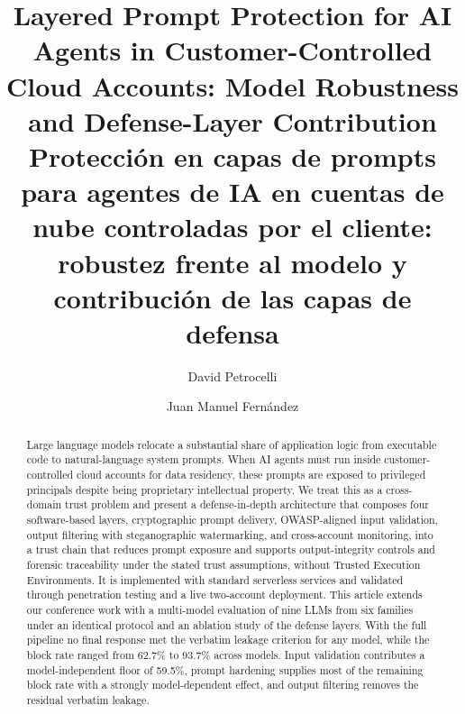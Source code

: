 \documentclass{jcst}
\title{Layered Prompt Protection for AI Agents in Customer-Controlled Cloud Accounts: Model Robustness and Defense-Layer Contribution \\
\large Protecci\'on en capas de prompts para agentes de IA en cuentas de nube controladas por el cliente: robustez frente al modelo y contribuci\'on de las capas de defensa}
\author[1\orcid{0009-0000-7331-3751}]{David Petrocelli}
\author[1,2\orcid{0000-0001-9291-3066}]{Juan Manuel Fern\'andez}
\affil[1]{National University of Luj\'an, Luj\'an, Argentina}
\affil[2]{Buenos Aires Institute of Technology (ITBA), Buenos Aires, Argentina}
\affil[ ]{\normalfont\texttt{dpetrocelli@unlu.edu.ar, jmfernandez@\{unlu,itba\}.edu.ar}}
\begin{document}
\maketitle

\begin{abstract}
Large language models relocate a substantial share of application logic from executable code to natural-language system prompts. When AI agents must run inside customer-controlled cloud accounts for data residency, these prompts are exposed to privileged principals despite being proprietary intellectual property. We treat this as a cross-domain trust problem and present a defense-in-depth architecture that composes four software-based layers, cryptographic prompt delivery, OWASP-aligned input validation, output filtering with steganographic watermarking, and cross-account monitoring, into a trust chain that reduces prompt exposure and supports output-integrity controls and forensic traceability under the stated trust assumptions, without Trusted Execution Environments. It is implemented with standard serverless services and validated through penetration testing and a live two-account deployment. This article extends our conference work with a multi-model evaluation of nine LLMs from six families under an identical protocol and an ablation study of the defense layers. With the full pipeline no final response met the verbatim leakage criterion for any model, while the block rate ranged from 62.7\% to 93.7\% across models. Input validation contributes a model-independent floor of 59.5\%, prompt hardening supplies most of the remaining block rate with a strongly model-dependent effect, and output filtering removes the residual verbatim leakage.
\end{abstract}

\end{document}
